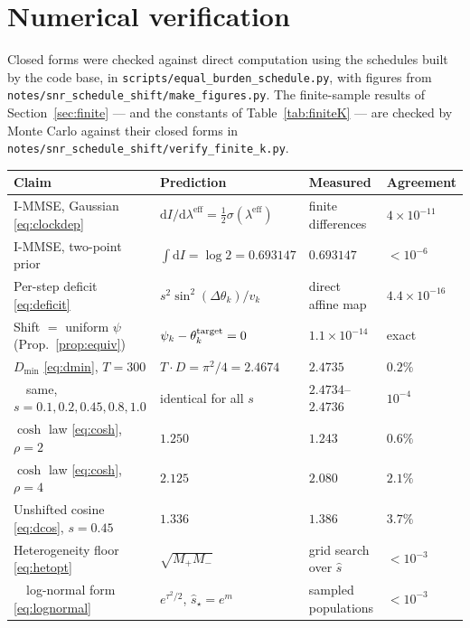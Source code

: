 \documentclass[11pt]{article}
\theoremstyle{definition}
\newcommand{\dd}{\mathrm{d}}
\newcommand{\leff}{\lambda^{\mathrm{eff}}}
\begin{document}
\section{Numerical verification}
\label{sec:verify}

Closed forms were checked against direct computation using the schedules built by
the code base, in \texttt{scripts/equal\_burden\_}\-\texttt{schedule.py}, with
figures from \texttt{notes/snr\_schedule\_shift/}\-\texttt{make\_figures.py}. The
finite-sample results of Section~\ref{sec:finite} --- and the constants of
Table~\ref{tab:finiteK} --- are checked by Monte Carlo against their closed forms
in \texttt{notes/snr\_schedule\_shift/}\-\texttt{verify\_finite\_k.py}.

\begin{table}[h]
  \centering
  \small
  \begin{tabular}{llll}
    \toprule
    Claim & Prediction & Measured & Agreement \\
    \midrule
    I-MMSE, Gaussian \eqref{eq:clockdep}
      & $\dd I/\dd\leff=\tfrac12\sigma(\leff)$ & finite differences
      & $4\times10^{-11}$ \\
    I-MMSE, two-point prior
      & $\int\!\dd I=\log2=0.693147$ & $0.693147$ & $<10^{-6}$ \\
    Per-step deficit \eqref{eq:deficit}
      & $s^2\sin^2(\Delta\theta_k)/v_k$ & direct affine map
      & $4.4\times10^{-16}$ \\
    Shift $=$ uniform $\psi$ (Prop.~\ref{prop:equiv})
      & $\psi_k-\theta^{\rm target}_k=0$ & $1.1\times10^{-14}$ & exact \\
    $D_{\min}$ \eqref{eq:dmin}, $T=300$
      & $T\!\cdot\!D=\pi^2/4=2.4674$ & $2.4735$ & $0.2\%$ \\
    \ \ same, $s=0.1,0.2,0.45,0.8,1.0$
      & identical for all $s$ & $2.4734$--$2.4736$ & $10^{-4}$ \\
    $\cosh$ law \eqref{eq:cosh}, $\rho=2$
      & $1.250$ & $1.243$ & $0.6\%$ \\
    $\cosh$ law \eqref{eq:cosh}, $\rho=4$
      & $2.125$ & $2.080$ & $2.1\%$ \\
    Unshifted cosine \eqref{eq:dcos}, $s=0.45$
      & $1.336$ & $1.386$ & $3.7\%$ \\
    Heterogeneity floor \eqref{eq:hetopt}
      & $\sqrt{M_+M_-}$ & grid search over $\hat s$
      & $<10^{-3}$ \\
    \ \ log-normal form \eqref{eq:lognormal}
      & $e^{\tau^2/2}$, $\hat s_\star=e^m$ & sampled populations & $<10^{-3}$ \\

\end{tabular}
\end{table}
\end{document}
